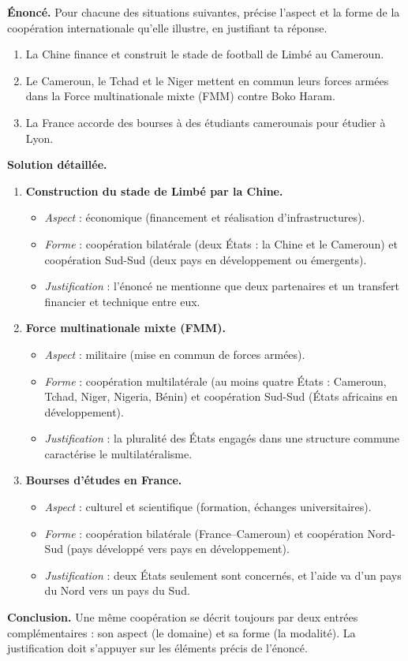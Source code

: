 \documentclass[11pt]{article}
\newcommand{\cle}[1]{{\popxbold\color{popdark}#1}}
\begin{document}
\begin{exoresolu}
\textbf{Énoncé.} Pour chacune des situations suivantes, précise l'aspect et la forme de la coopération internationale qu'elle illustre, en justifiant ta réponse.
\begin{enumerate}
\item La Chine finance et construit le stade de football de Limbé au Cameroun.
\item Le Cameroun, le Tchad et le Niger mettent en commun leurs forces armées dans la Force multinationale mixte (FMM) contre Boko Haram.
\item La France accorde des bourses à des étudiants camerounais pour étudier à Lyon.
\end{enumerate}
\tcblower
\textbf{Solution détaillée.}
\begin{enumerate}
\item \textbf{Construction du stade de Limbé par la Chine.}
\begin{itemize}
\item \emph{Aspect} : économique (financement et réalisation d'infrastructures).
\item \emph{Forme} : coopération \cle{bilatérale} (deux États : la Chine et le Cameroun) et coopération \cle{Sud-Sud} (deux pays en développement ou émergents).
\item \emph{Justification} : l'énoncé ne mentionne que deux partenaires et un transfert financier et technique entre eux.
\end{itemize}
\item \textbf{Force multinationale mixte (FMM).}
\begin{itemize}
\item \emph{Aspect} : militaire (mise en commun de forces armées).
\item \emph{Forme} : coopération \cle{multilatérale} (au moins quatre États : Cameroun, Tchad, Niger, Nigeria, Bénin) et coopération \cle{Sud-Sud} (États africains en développement).
\item \emph{Justification} : la pluralité des États engagés dans une structure commune caractérise le multilatéralisme.
\end{itemize}
\item \textbf{Bourses d'études en France.}
\begin{itemize}
\item \emph{Aspect} : culturel et scientifique (formation, échanges universitaires).
\item \emph{Forme} : coopération \cle{bilatérale} (France--Cameroun) et coopération \cle{Nord-Sud} (pays développé vers pays en développement).
\item \emph{Justification} : deux États seulement sont concernés, et l'aide va d'un pays du Nord vers un pays du Sud.
\end{itemize}
\end{enumerate}
\textbf{Conclusion.} Une même coopération se décrit toujours par deux entrées complémentaires : son aspect (le domaine) et sa forme (la modalité). La justification doit s'appuyer sur les éléments précis de l'énoncé.
\end{exoresolu}
\end{document}
